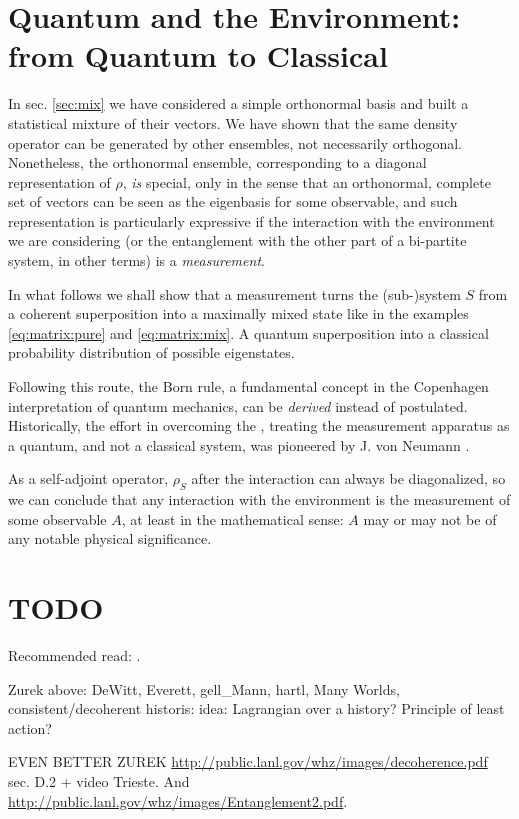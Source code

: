 \section{Quantum and the Environment: from Quantum to Classical}
\label{sec:q2c}

In sec. \ref{sec:mix} we have considered a simple orthonormal basis
and built a statistical mixture of their vectors. We have shown
that the same density operator can be generated by other ensembles,
not necessarily orthogonal. Nonetheless, the orthonormal ensemble,
corresponding to a diagonal representation of $\rho$, \emph{is}
special, only in the sense that an orthonormal, complete set of
vectors can be seen as the eigenbasis for some observable,
and such representation is particularly expressive if the
interaction with the environment we are considering
(or the entanglement with the other part of a bi-partite system, in other terms)
is a \emph{measurement}.

In what follows we shall show that a measurement turns
the (sub-)system $S$ from a coherent superposition into a
maximally mixed state like in the examples
\eqref{eq:matrix:pure} and \eqref{eq:matrix:mix}.
A quantum superposition into a classical probability
distribution of possible eigenstates.

Following this route, the Born rule, a fundamental concept in the
Copenhagen interpretation of quantum mechanics, can be
\emph{derived} instead of postulated. Historically,
the effort in overcoming the ,
treating the measurement apparatus as a quantum,
and not a classical system,
was pioneered by J. von Neumann \parencite{VonNeumann}.

As a self-adjoint operator, $\rho_S$ after the interaction
can always be diagonalized, so we can conclude that any
interaction with the environment is the measurement of some
observable $A$, at least in the mathematical sense: $A$ may or
may not be of any notable physical significance.

\section{TODO}

Recommended read: \cite{Zurek_Decoherence, Zurek_Fundamentals}.

Zurek above: DeWitt, Everett, gell_Mann, hartl, Many Worlds, consistent/decoherent historis:
idea: Lagrangian over a history? Principle of least action?

EVEN BETTER ZUREK \url{http://public.lanl.gov/whz/images/decoherence.pdf} sec. D.2
+ video Trieste. And \url{http://public.lanl.gov/whz/images/Entanglement2.pdf}.

